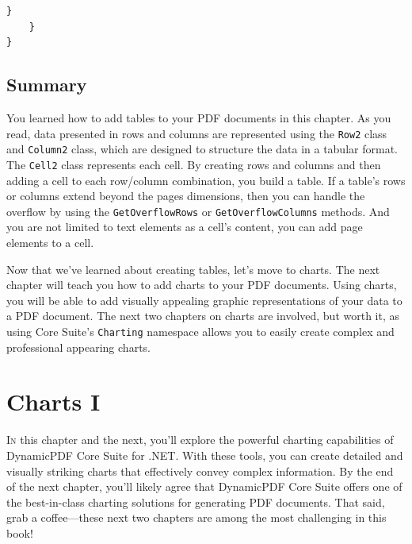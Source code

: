 \documentclass[american]{tufte-book}
\numberwithin{equation}{section}
\numberwithin{figure}{section}
\def\color#1{}%
\begin{document}
{\begin{lstlisting}[caption={Using AutoLayout to create a PDF document.},label={lis:autolayout-table},basicstyle={\footnotesize\ttfamily},breaklines=true]
        }
    }
}
\end{lstlisting}
\leavevmode\egroup

\section{Summary}

You learned how to add tables to your PDF documents in this chapter.
As you read, data presented in rows and columns are represented using
the \texttt{Row2} class and \texttt{Column2} class, which are designed
to structure the data in a tabular format. The \texttt{Cell2} class
represents each cell. By creating rows and columns and then adding
a cell to each row/column combination, you build a table. If a table's
rows or columns extend beyond the pages dimensions, then you can handle
the overflow by using the \texttt{GetOverflowRows} or \texttt{GetOverflowColumns}
methods. And you are not limited to text elements as a cell's content,
you can add page elements to a cell. 

Now that we've learned about creating tables, let's move to charts.
The next chapter will teach you how to add charts to your PDF documents.
Using charts, you will be able to add visually appealing graphic representations
of your data to a PDF document. The next two chapters on charts are
involved, but worth it, as using Core Suite's \texttt{Charting} namespace
allows you to easily create complex and professional appearing charts. 

\color{white}
\chapter{Charts I}\label{chap:Charts}
\color{black}
\BgThispage
\vspace{8.00em}
\lettrine[lines=2,lhang=0.1]{I}{n} this chapter and the next, you’ll explore the powerful charting capabilities of DynamicPDF Core Suite for .NET. With these tools, you can create detailed and visually striking charts that effectively convey complex information. By the end of the next chapter, you’ll likely agree that DynamicPDF Core Suite offers one of the best-in-class charting solutions for generating PDF documents. That said, grab a coffee—these next two chapters are among the most challenging in this book!

}
\end{document}
